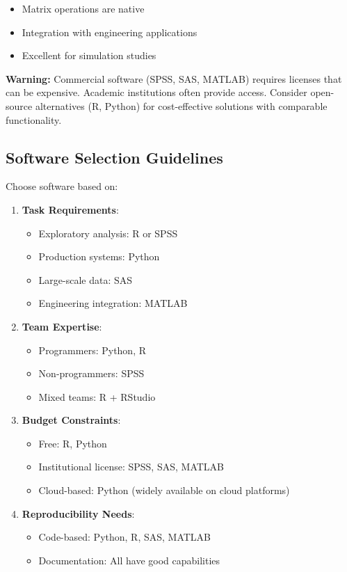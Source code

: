 \documentclass[
]{article}
\begin{document}
\begin{itemize}
\item
  Matrix operations are native
\item
  Integration with engineering applications
\item
  Excellent for simulation studies
\end{itemize}

\textbf{Warning: } Commercial software (SPSS, SAS, MATLAB) requires
licenses that can be expensive. Academic institutions often provide
access. Consider open-source alternatives (R, Python) for cost-effective
solutions with comparable functionality.

\textbf{ }

\subsection{Software Selection Guidelines}

Choose software based on:

\begin{enumerate}
\item
  \textbf{Task Requirements}:

  \begin{itemize}
  \item
    Exploratory analysis: R or SPSS
  \item
    Production systems: Python
  \item
    Large-scale data: SAS
  \item
    Engineering integration: MATLAB
  \end{itemize}
\item
  \textbf{Team Expertise}:

  \begin{itemize}
  \item
    Programmers: Python, R
  \item
    Non-programmers: SPSS
  \item
    Mixed teams: R + RStudio
  \end{itemize}
\item
  \textbf{Budget Constraints}:

  \begin{itemize}
  \item
    Free: R, Python
  \item
    Institutional license: SPSS, SAS, MATLAB
  \item
    Cloud-based: Python (widely available on cloud platforms)
  \end{itemize}
\item
  \textbf{Reproducibility Needs}:

  \begin{itemize}
  \item
    Code-based: Python, R, SAS, MATLAB
  \item
    Documentation: All have good capabilities
  \end{itemize}
\end{enumerate}
\end{document}

